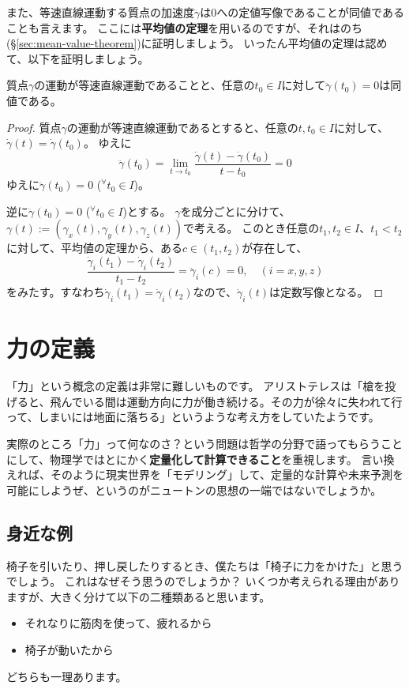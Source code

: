 また、等速直線運動する質点の加速度$\ddot\gamma$は0への定値写像であることが同値であることも言えます。
ここには\textbf{平均値の定理}を用いるのですが、それはのち(§\ref{sec:mean-value-theorem})に証明しましょう。
いったん平均値の定理は認めて、以下を証明しましょう。
\begin{theorem}
  質点$\gamma$の運動が等速直線運動であることと、任意の$t_0\in I$に対して$\ddot\gamma(t_0)=0$は同値である。
\end{theorem}
\begin{proof}
  質点$\gamma$の運動が等速直線運動であるとすると、任意の$t,t_0\in I$に対して、$\dot\gamma(t)=\dot\gamma(t_0)$。
  ゆえに
  \[
    \ddot\gamma(t_0)=\lim_{t\to t_0}\frac{\dot\gamma(t)-\dot\gamma(t_0)}{t-t_0}=0
  \]
  ゆえに$\ddot\gamma(t_0)=0$ (${}^\forall t_0\in I$)。

  逆に$\ddot\gamma(t_0)=0$ (${}^\forall t_0\in I$)とする。
  $\gamma$を成分ごとに分けて、$\gamma(t):=(\gamma_x(t),\gamma_y(t),\gamma_z(t))$で考える。
  このとき任意の$t_1,t_2\in I$、$t_1<t_2$に対して、平均値の定理から、ある$c\in(t_1,t_2)$が存在して、
  \[
    \frac{\dot\gamma_i(t_1)-\dot\gamma_i(t_2)}{t_1-t_2}=\ddot\gamma_i(c)=0,\quad(i=x,y,z)
  \]
  をみたす。すなわち$\dot\gamma_i(t_1)=\dot\gamma_i(t_2)$なので、$\dot\gamma_i(t)$は定数写像となる。
\end{proof}



\section{力の定義}

「力」という概念の定義は非常に難しいものです。
アリストテレスは「槍を投げると、飛んでいる間は運動方向に力が働き続ける。その力が徐々に失われて行って、しまいには地面に落ちる」というような考え方をしていたようです。

実際のところ「力」って何なのさ？という問題は哲学の分野で語ってもらうことにして、物理学ではとにかく\textbf{定量化して計算できること}を重視します。
言い換えれば、そのように現実世界を「モデリング」して、定量的な計算や未来予測を可能にしようぜ、というのがニュートンの思想の一端ではないでしょうか。

\subsection{身近な例}

椅子を引いたり、押し戻したりするとき、僕たちは「椅子に力をかけた」と思うでしょう。
これはなぜそう思うのでしょうか？
いくつか考えられる理由がありますが、大きく分けて以下の二種類あると思います。
\begin{itemize}
  \item それなりに筋肉を使って、疲れるから
  \item 椅子が動いたから
\end{itemize}
どちらも一理あります。

